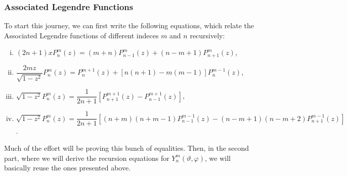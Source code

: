 \subsubsection{Associated Legendre Functions}
To start this journey, we can first write the following equations, which relate the Associated Legendre functions of different indeces $m$ and $n$ recursively:
\begin{enumerate}[(i)]
  \item $(2n+1) x P^m_n(z)= (m+n) P^m_{n-1}(z) + (n-m+1) P^m_{n+1}(z)$, \label{kugel:eq:rec_rel_1}
  \item $\dfrac{2mz}{\sqrt{1-z^2}} P^m_n(z) = P^{m+1}_n(z) + [n(n+1)-m(m-1)] P^{m-1}_n(z)$, \label{kugel:eq:rec_rel_2}
  \item $\sqrt{1-z^2} P^m_n(z) = \dfrac{1}{2n+1} \left[ P^{m+1}_{n+1}(z) - P^{m+1}_{n-1}(z) \right]$,  \label{kugel:eq:rec_rel_3}
  \item $\sqrt{1-z^2} P^m_n(z) = \dfrac{1}{2n+1} \left[ (n+m)(n+m-1)P^{m-1}_{n-1}(z) - (n-m+1)(n-m+2)P^{m-1}_{n+1}(z) \right]$.  \label{kugel:eq:rec_rel_4}
\end{enumerate}
Much of the effort will be proving this bunch of equalities. Then, in the second part, where we will derive the recursion equations for $Y^m_n(\vartheta,\varphi)$, we will basically reuse the ones presented above.

